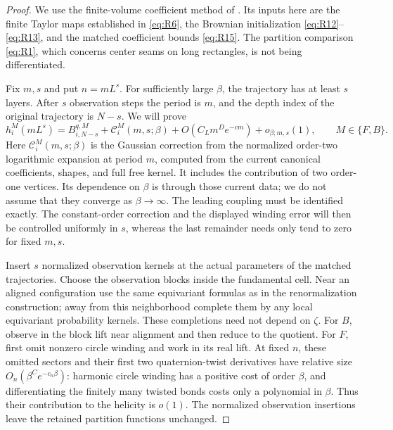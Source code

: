 \begin{proof}
We use the finite-volume coefficient method of
\cite[Section ``Determining the kinetic drift,'' subsection
``Computing the same coefficients after blocking'']{SharpO4}. Its inputs
here are the finite Taylor maps established in \eqref{eq:R6}, the
Brownian initialization \eqref{eq:R12}--\eqref{eq:R13}, and the matched
coefficient bounds \eqref{eq:R15}. The partition comparison
\eqref{eq:R1}, which concerns center seams on long rectangles, is not
being differentiated.

Fix $m,s$ and put $n=mL^s$. For sufficiently large $\beta$, the
trajectory has at least $s$ layers. After $s$ observation steps the period
is $m$, and the depth index of the original trajectory is $N-s$. We will prove
\begin{equation}
 h_i^M(mL^s)
   =B_{i,N-s}^{q,M}+\mathcal C_i^M(m,s;\beta)
       +O(C_Lm^D e^{-cm})+o_{\beta;m,s}(1),
 \qquad M\in\{F,B\}.
 \label{eq:matching-helicity-decomposition}
\end{equation}
Here $\mathcal C_i^M(m,s;\beta)$ is the Gaussian correction from the
normalized order-two logarithmic expansion at period $m$, computed from
the current canonical coefficients, shapes, and full free kernel. It
includes the contribution of two order-one vertices. Its dependence on
$\beta$ is through those current data; we do not assume that they
converge as $\beta\to\infty$. The leading coupling must be identified
exactly. The constant-order correction and the displayed winding error
will then be controlled uniformly in $s$, whereas the last remainder
needs only tend to zero for fixed $m,s$.

Insert $s$ normalized observation kernels at the actual parameters of
the matched trajectories. Choose the observation blocks inside the fundamental
cell. Near an aligned configuration use the same equivariant formulas as in the renormalization construction; away
from this neighborhood complete them by any local equivariant probability
kernels. These completions need not depend on $\zeta$. For $B$, observe in
the block lift near alignment and then reduce to the quotient. For $F$,
first omit nonzero circle winding and work in its real lift. At fixed
$n$, these omitted sectors and their first two quaternion-twist derivatives
have relative size $O_n(\beta^C e^{-c_n\beta})$: harmonic circle winding
has a positive cost of order $\beta$, and differentiating the finitely
many twisted bonds costs only a polynomial in $\beta$. Thus their
contribution to the helicity is $o(1)$. The normalized observation
insertions leave the retained partition functions unchanged.


\end{proof}
